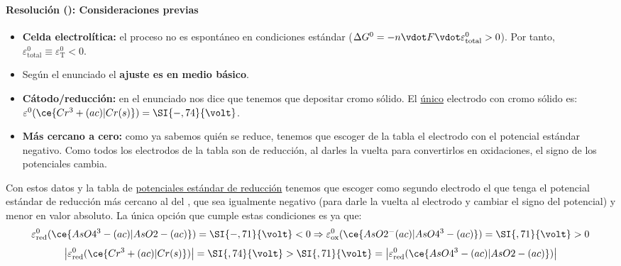 \begin{frame}
	\frametitle{\ejerciciocmd}
	\framesubtitle{Resolución (): Consideraciones previas}
	\begin{itemize}
		\item\textbf{Celda electrolítica:} el proceso no es espontáneo en condiciones estándar ($\Delta G^0 = - n\vdot F\vdot\varepsilon^0_{\text{total}} > 0$). Por tanto, $\varepsilon^0_{\text{total}}\equiv\varepsilon^0_{\text{T}} < 0$.
		\item Según el enunciado el \textbf{ajuste es en medio básico}.
		\item\textbf{Cátodo/reducción:} en el enunciado nos dice que tenemos que depositar cromo sólido. El \underline{único} electrodo con cromo sólido es: $\varepsilon^0(\ce{Cr^3+(ac)|Cr(s)}) = \SI{-,74}{\volt}$.
		\item\textbf{Más cercano a cero:} como ya sabemos quién se reduce, tenemos que escoger de la tabla el electrodo con el potencial estándar negativo. Como todos los electrodos de la tabla son de reducción, al darles la vuelta para convertirlos en oxidaciones, el signo de los potenciales cambia.
	\end{itemize}
	Con estos datos y la tabla de \underline{potenciales estándar de reducción} tenemos que escoger como segundo electrodo el que tenga el potencial estándar de reducción más cercano al del , que sea igualmente negativo (para darle la vuelta al electrodo y cambiar el signo del potencial) y menor en valor absoluto. La única opción que cumple estas condiciones es  ya que:
	$$
		\varepsilon^0_{\text{red}}(\ce{AsO4^3-(ac)|AsO2-(ac)})=\SI{-,71}{\volt}<0\Rightarrow\varepsilon^0_{\text{ox}}(\ce{AsO2^-(ac)|AsO4^3-(ac)})=\SI{,71}{\volt}>0
	$$
	$$
		\left|\varepsilon^0_{\text{red}}(\ce{Cr^3+(ac)|Cr(s)})\right|=\SI{,74}{\volt} > \SI{,71}{\volt}=\left|\varepsilon^0_{\text{red}}(\ce{AsO4^3-(ac)|AsO2-(ac)})\right|
	$$
\end{frame}

\newcommand{\anodo}{Semirreacción de oxidación (ánodo)}
\newcommand{\catodo}{Semirreacción de reducción (cátodo)}


